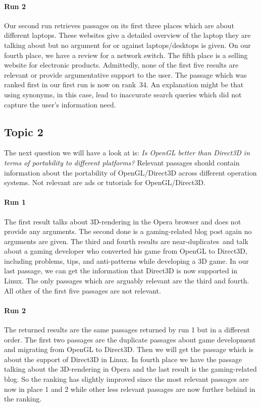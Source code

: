\paragraph{Run 2}

Our second run retrieves passages on its first three places which are about different laptops.
These websites give a detailed overview of the laptop they are talking about but no argument for or against laptops/desktops is given.
On our fourth place, we have a review for a network switch.
The fifth place is a selling website for electronic products.
Admittedly, none of the first five results are relevant or provide argumentative support to the user.
The passage which was ranked first in our first run is now on rank~34.
An explanation might be that using synonyms, in this case, lead to inaccurate search queries which did not capture the user's information need.

\subsection{Topic 2}

The next question we will have a look at is:
\textit{Is OpenGL better than Direct3D in terms of portability to different platforms?}
Relevant passages should contain information about the portability of OpenGL/Direct3D across different operation systems.
Not relevant are ads or tutorials for OpenGL/Direct3D.

\paragraph{Run 1}

The first result talks about 3D-rendering in the Opera browser and does not provide any arguments.
The second done is a gaming-related blog post again no arguments are given.
The third and fourth results are near-duplicates~\todocite and talk about a gaming developer who converted his game from OpenGL to Direct3D, including problems, tips, and anti-patterns while developing a 3D game.
In our last passage, we can get the information that Direct3D is now supported in Linux.
The only passages which are arguably relevant are the third and fourth.
All other of the first five passages are not relevant.

\paragraph{Run 2}

The returned results are the same passages returned by run 1 but in a different order.
The first two passages are the duplicate passages about game development and migrating from OpenGL to Direct3D.
Then we will get the passage which is about the support of Direct3D in Linux.
In fourth place we have the passage talking about the 3D-rendering in Opera and the last result is the gaming-related blog.
So the ranking has slightly improved since the most relevant passages are now in place 1 and 2 while other less relevant passages are now further behind in the ranking.

